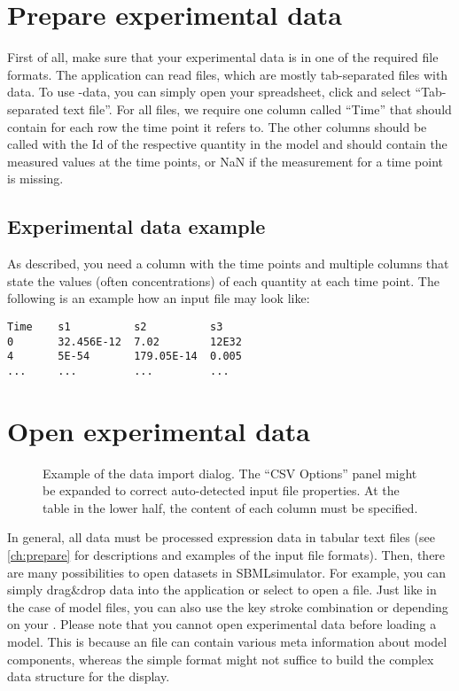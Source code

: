 \section{Prepare experimental data}
\label{ch:prepare}

First of all, make sure that your experimental data is in one of the required file formats.
The application can read \CSV files, which are mostly tab-separated files with data.
To use \Excel-data, you can simply open your \Excel spreadsheet, click  and select ``Tab-separated text file''.
For all files, we require one column called ``Time'' that should contain for each row the time point it refers to.
The other columns should be called with the \ac{Id} of the respective quantity in the model and should contain the measured values at the time points, or \ac{NaN} if the measurement for a time point is missing. 

\subsection{Experimental data example}
As described, you need a column with the time points and multiple columns that state the values (often concentrations) of each quantity at each time point.
The following is an example how an input file may look like:
\begin{lstlisting}[caption={Input file example for experimental data},label={lst:input:exp},numbers=none,captionpos=t,float=h]
Time    s1          s2          s3
0       32.456E-12  7.02        12E32
4       5E-54       179.05E-14  0.005
...     ...         ...         ...
\end{lstlisting}

\section{Open experimental data}
\label{sec:opendata}
\begin{figure}[h]
\centering
{}
\caption[Example of the data import dialog]{Example of the data import dialog.
The ``CSV Options'' panel might be expanded to correct auto-detected input file properties.
At the table in the lower half, the content of each column must be specified.}
\label{fig:inputdialog}
\end{figure}
In general, all data must be processed expression data in tabular text files (see \vref{ch:prepare} for descriptions and examples of the input file formats).
Then, there are many possibilities to open datasets in SBMLsimulator.
For example, you can simply drag\&drop data into the application or select  to open a file.
Just like in the case of model files, you can also use the key stroke combination  or  depending on your \OS.
Please note that you cannot open experimental data before loading a model.
This is because an \SBML file can contain various meta information about model components, whereas the simple \CSV format might not suffice to build the complex data structure for the display.


